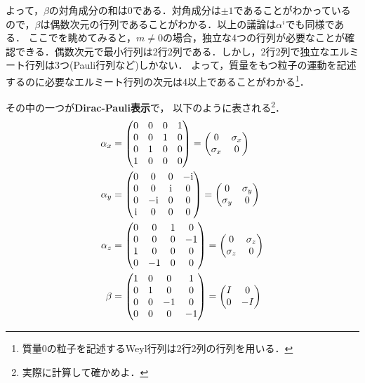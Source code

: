 \documentclass{report}
\begin{document}
よって，$\beta$の対角成分の和は0である．対角成分は$\pm1$であることがわかっているので，$\beta$は偶数次元の行列であることがわかる．以上の議論は$\alpha^i$でも同様である．
ここでを眺めてみると，$m\neq0$の場合，独立な4つの行列が必要なことが確認できる．偶数次元で最小行列は2行2列である．しかし，2行2列で独立なエルミート行列は3つ(Pauli行列など)しかない．
よって，質量をもつ粒子の運動を記述するのに必要なエルミート行列の次元は4以上であることがわかる\footnote{質量0の粒子を記述するWeyl行列は2行2列の行列を用いる．}．

その中の一つが\textbf{Dirac-Pauli表示}で，
以下のように表される\footnote{実際に計算して確かめよ．}．
\begin{align}
  \alpha_x &= 
  \begin{pmatrix}
    0 & 0 & 0 & 1\\
    0 & 0 & 1 & 0\\
    0 & 1 & 0 & 0\\
    1 & 0 & 0 & 0\\
  \end{pmatrix}
  =
  \begin{pmatrix}
    0 & \sigma_x\\
    \sigma_x & 0
  \end{pmatrix}\\
  \alpha_y &= 
  \begin{pmatrix}
    0 & 0 & 0 & -\mathrm{i}\\
    0 & 0 & \mathrm{i} & 0\\
    0 & -\mathrm{i} & 0 & 0\\
    \mathrm{i} & 0 & 0 & 0\\
  \end{pmatrix}
  =
  \begin{pmatrix}
    0 & \sigma_y\\
    \sigma_y & 0
  \end{pmatrix}\\
  \alpha_z &= 
  \begin{pmatrix}
    0 & 0 & 1 & 0\\
    0 & 0 & 0 & -1\\
    1 & 0 & 0 & 0\\
    0 & -1 & 0 & 0\\
  \end{pmatrix}
  =
  \begin{pmatrix}
    0 & \sigma_z\\
    \sigma_z & 0
  \end{pmatrix}\\
  \beta &= 
  \begin{pmatrix}
    1 & 0 & 0 & 1\\
    0 & 1 & 0 & 0\\
    0 & 0 & -1 & 0\\
    0 & 0 & 0 & -1\\
  \end{pmatrix}
  =
  \begin{pmatrix}
    I & 0\\
    0 & -I
  \end{pmatrix}
\end{align}
\end{document}
